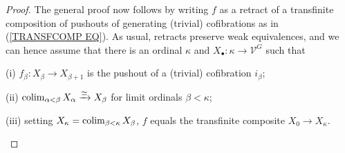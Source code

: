 \documentclass[a4paper,10pt]{article}%
\begin{document}
\begin{proof}
The general proof now follows by writing $f$ as a retract of a transfinite composition of pushouts of generating (trivial) cofibrations as in (\ref{TRANSFCOMP EQ}).
As usual, retracts preserve weak equivalences,
and we can hence assume that there is an ordinal $\kappa$
and $X_{\bullet} \colon \kappa \to \mathcal{V}^G$
such that 
\begin{inparaenum}
\item[(i)] 
$f_{\beta} \colon X_{\beta} \to X_{\beta+1}$
is the pushout of a (trivial) cofibration $i_{\beta}$;
\item[(ii)] 
$\operatorname{colim}_{\alpha < \beta} X_{\alpha} \xrightarrow{\simeq} X_{\beta}$ for limit ordinals $\beta < \kappa$;
\item[(iii)] setting 
$X_{\kappa} = \operatorname{colim}_{\beta < \kappa} X_{\beta}$, 
$f$ equals the transfinite composite $X_0 \to X_{\kappa}$.
\end{inparaenum}


\end{proof}
\end{document}
